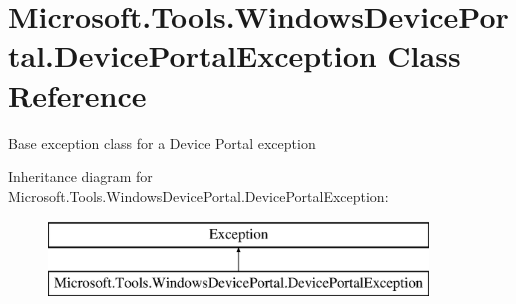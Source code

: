 \hypertarget{class_microsoft_1_1_tools_1_1_windows_device_portal_1_1_device_portal_exception}{}\section{Microsoft.\+Tools.\+Windows\+Device\+Portal.\+Device\+Portal\+Exception Class Reference}
\label{class_microsoft_1_1_tools_1_1_windows_device_portal_1_1_device_portal_exception}


Base exception class for a Device Portal exception  


Inheritance diagram for Microsoft.\+Tools.\+Windows\+Device\+Portal.\+Device\+Portal\+Exception\+:\begin{figure}[H]
\begin{center}
\leavevmode
\includegraphics[height=2.000000cm]{class_microsoft_1_1_tools_1_1_windows_device_portal_1_1_device_portal_exception}
\end{center}
\end{figure}
